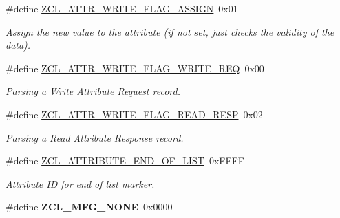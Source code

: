 \begin{DoxyCompactItemize}
\item 
\#define \hyperlink{group__zcl_ga2bb65a6c04a14957000feaa12de9769c}{Z\-C\-L\-\_\-\-A\-T\-T\-R\-\_\-\-W\-R\-I\-T\-E\-\_\-\-F\-L\-A\-G\-\_\-\-A\-S\-S\-I\-G\-N}~0x01
\begin{DoxyCompactList}\small\item\em Assign the new value to the attribute (if not set, just checks the validity of the data). \end{DoxyCompactList}\item 
\hypertarget{group__zcl_gadf9cb5a2dc8c96c57fbfafe48247256a}{\#define \hyperlink{group__zcl_gadf9cb5a2dc8c96c57fbfafe48247256a}{Z\-C\-L\-\_\-\-A\-T\-T\-R\-\_\-\-W\-R\-I\-T\-E\-\_\-\-F\-L\-A\-G\-\_\-\-W\-R\-I\-T\-E\-\_\-\-R\-E\-Q}~0x00}\label{group__zcl_gadf9cb5a2dc8c96c57fbfafe48247256a}

\begin{DoxyCompactList}\small\item\em Parsing a Write Attribute Request record. \end{DoxyCompactList}\item 
\hypertarget{group__zcl_ga928e86b414e2662235b7bb39ffaf0635}{\#define \hyperlink{group__zcl_ga928e86b414e2662235b7bb39ffaf0635}{Z\-C\-L\-\_\-\-A\-T\-T\-R\-\_\-\-W\-R\-I\-T\-E\-\_\-\-F\-L\-A\-G\-\_\-\-R\-E\-A\-D\-\_\-\-R\-E\-S\-P}~0x02}\label{group__zcl_ga928e86b414e2662235b7bb39ffaf0635}

\begin{DoxyCompactList}\small\item\em Parsing a Read Attribute Response record. \end{DoxyCompactList}\item 
\hypertarget{group__zcl_gab05da20cf1dfaef97e20dfca2fd26d14}{\#define \hyperlink{group__zcl_gab05da20cf1dfaef97e20dfca2fd26d14}{Z\-C\-L\-\_\-\-A\-T\-T\-R\-I\-B\-U\-T\-E\-\_\-\-E\-N\-D\-\_\-\-O\-F\-\_\-\-L\-I\-S\-T}~0x\-F\-F\-F\-F}\label{group__zcl_gab05da20cf1dfaef97e20dfca2fd26d14}

\begin{DoxyCompactList}\small\item\em Attribute I\-D for end of list marker. \end{DoxyCompactList}\item 
\hypertarget{group__zcl_ga7966bd513458cfd80b13a81512712cd8}{\#define {\bfseries Z\-C\-L\-\_\-\-M\-F\-G\-\_\-\-N\-O\-N\-E}~0x0000}\label{group__zcl_ga7966bd513458cfd80b13a81512712cd8}

\end{DoxyCompactItemize}
